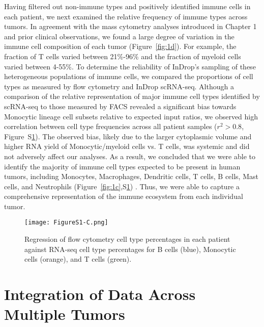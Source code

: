 Having filtered out non-immune types and positively identified immune cells in each patient, we next examined the relative frequency of immune types across tumors.
In agreement with the mass cytometry analyses introduced in Chapter 1 \citep{Chevrier2017,Lavin2017} and prior clinical observations, we found a large degree of variation in the immune cell composition of each tumor (Figure~\ref{fig:1d}). %
For example, the fraction of T cells varied between 21\%-96\% and the fraction of myeloid cells varied between 4-55\%. To determine the reliability of InDrop's sampling of these heterogeneous populations of immune cells, we compared the proportions of cell types as measured by flow cytometry and InDrop scRNA-seq. 
Although a comparison of the relative representation of major immune cell types identified by scRNA-seq to those measured by FACS revealed a significant bias towards Monocytic lineage cell subsets relative to expected input ratios, we observed high correlation between cell type frequencies across all patient samples ($r^2 > 0.8$, Figure~S\ref{fig:s1c}). 
The observed bias, likely due to the larger cytoplasmic volume and higher RNA yield of Monocytic/myeloid cells vs. T cells, was systemic and did not adversely affect our analyses.
As a result, we concluded that we were able to identify the majority of immune cell types expected to be present in human tumors, including Monocytes, Macrophages, Dendritic cells, T cells, B cells, Mast cells, and Neutrophils (Figure~\ref{fig:1c},S\ref{fig:s1c}) \citep{Jeffrey2006,Novershtern2011}. 
Thus, we were able to capture a comprehensive representation of the immune ecosystem from each individual tumor.

\begin{figure}
\centering
\texttt{[image: FigureS1-C.png]}
\caption{Regression of flow cytometry cell type percentages in each patient against RNA-seq cell type percentages for B cells (blue), Monocytic cells (orange), and T cells (green).
}
\label{fig:s1c}
\end{figure}

\section{Integration of Data Across Multiple Tumors}

